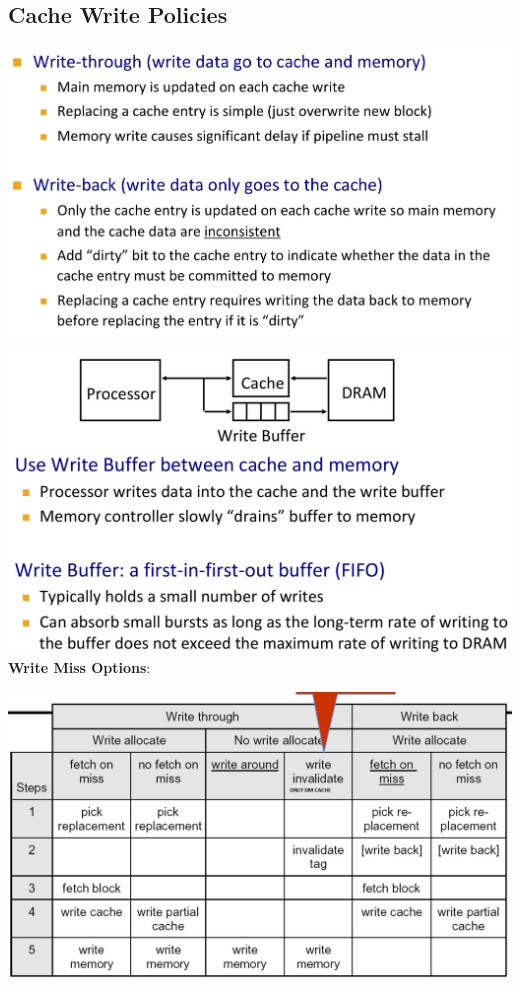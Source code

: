 \subsection*{Cache Write Policies}
\includegraphics[width=\linewidth]{png/write.png}
\includegraphics[width=\linewidth]{png/write(1).png}
\textbf{Write Miss Options}:

\includegraphics[width=\linewidth]{png/writemiss.png}

